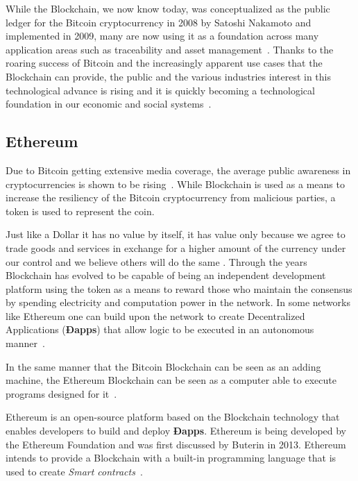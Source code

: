   While the Blockchain, we now know today, was conceptualized as the public
  ledger for the Bitcoin cryptocurrency in 2008 by Satoshi Nakamoto and
  implemented in 2009, many are now using it as a foundation across many
  application areas such as traceability and asset management~\cite{MIT2016}.
  Thanks to the roaring success of Bitcoin and the increasingly apparent use
  cases that the Blockchain can provide, the public and the various industries
  interest in this technological advance is rising and it is quickly becoming a
  technological foundation in our economic and social systems~\cite{Zago2018,
  Marr2018,Long2018}.

  \subsection{Ethereum}

  Due to Bitcoin getting extensive media coverage, the average public awareness
  in cryptocurrencies is shown to be rising~\cite{BitAwareness2017}. While
  Blockchain is used as a means to increase the resiliency of the Bitcoin
  cryptocurrency from malicious parties, a token is used to represent the coin. 
  
  Just like a Dollar it has no value by itself, it has value only because we
  agree to trade goods and services in exchange for a higher amount of the
  currency under our control and we believe others will do the same
  \cite{aliessi2016}. Through the years Blockchain has evolved to be capable of
  being an independent development platform using the token as a means to
  reward those who maintain the consensus by spending electricity and
  computation power in the network. In some networks like Ethereum one can
  build upon the network to create Decentralized Applications (\textbf{Ðapps})
  that allow logic to be executed in an autonomous manner~\cite{Wood2017}. 
  
  In the same manner that the Bitcoin Blockchain can be seen as an adding
  machine, the Ethereum Blockchain can be seen as a computer able to execute
  programs designed for it~\cite{Wood2015}.

  Ethereum is an open-source platform based on the Blockchain technology that
  enables developers to build and deploy \textbf{Ðapps}. Ethereum is being
  developed by the Ethereum Foundation and was first discussed by Buterin in
  2013.  Ethereum intends to provide a Blockchain with a built-in programming
  language that is used to create \textit{Smart contracts}~\cite{Wood2017}.

